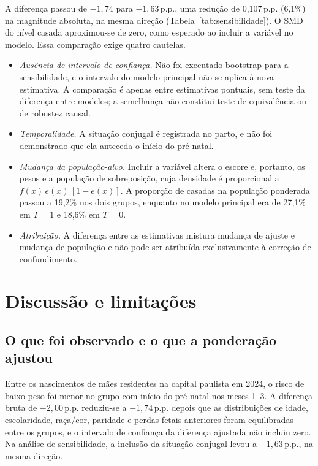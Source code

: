 \documentclass[11pt,a4paper]{article}
\newcommand{\pp}{\,p.p.}
\begin{document}
A diferença passou de $-1{,}74$ para $-1{,}63$\pp, uma redução de 0,107\pp{} (6,1\%) na
magnitude absoluta, na mesma direção (Tabela~\ref{tab:sensibilidade}). O SMD do nível
casada aproximou-se de zero, como esperado ao incluir a variável no modelo. Essa
comparação exige quatro cautelas.

\begin{itemize}
\item \emph{Ausência de intervalo de confiança.} Não foi executado bootstrap para a
sensibilidade, e o intervalo do modelo principal não se aplica à nova estimativa. A
comparação é apenas entre estimativas pontuais, sem teste da diferença entre modelos; a
semelhança não constitui teste de equivalência ou de robustez causal.
\item \emph{Temporalidade.} A situação conjugal é registrada no parto, e não foi
demonstrado que ela anteceda o início do pré-natal.
\item \emph{Mudança da população-alvo.} Incluir a variável altera o escore e, portanto, os
pesos e a população de sobreposição, cuja densidade é proporcional a
$f(x)\,e(x)\,[1-e(x)]$. A proporção de casadas na população ponderada passou a 19,2\% nos
dois grupos, enquanto no modelo principal era de 27,1\% em $T=1$ e 18,6\% em $T=0$.
\item \emph{Atribuição.} A diferença entre as estimativas mistura mudança de ajuste e
mudança de população e não pode ser atribuída exclusivamente à correção de confundimento.
\end{itemize}

\section{Discussão e limitações}\label{sec:discussao}

\subsection{O que foi observado e o que a ponderação ajustou}

Entre os nascimentos de mães residentes na capital paulista em 2024, o risco de baixo peso
foi menor no grupo com início do pré-natal nos meses 1--3. A diferença bruta de
$-2{,}00$\pp{} reduziu-se a $-1{,}74$\pp{} depois que as distribuições de idade,
escolaridade, raça/cor, paridade e perdas fetais anteriores foram equilibradas entre os
grupos, e o intervalo de confiança da diferença ajustada não incluiu zero. Na análise de
sensibilidade, a inclusão da situação conjugal levou a $-1{,}63$\pp, na mesma direção.
\end{document}
